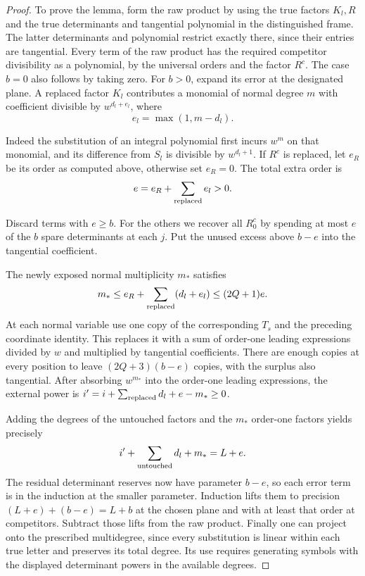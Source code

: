 \begin{proof}
To prove the lemma, form the raw product by using the true
factors \(K_l,R\) and the true determinants and tangential
polynomial in the distinguished frame. The latter determinants
and polynomial restrict exactly there, since their entries are
tangential. Every term of the raw product has the required
competitor divisibility as a polynomial, by the universal
orders and the factor \(R^c\). The case \(b=0\) also follows
by taking zero. For \(b>0\), expand its error at the designated
plane. A replaced factor \(K_l\) contributes a monomial of
normal degree \(m\) with coefficient divisible by
\(w^{d_l+e_l}\), where
\[
 e_l=\max(1,m-d_l).
\]

Indeed the substitution of an integral polynomial first incurs
\(w^m\) on that monomial, and its difference from \(S_l\)
is divisible by \(w^{d_l+1}\). If \(R^c\) is replaced, let
\(e_R\) be its order as computed above, otherwise set \(e_R=0\).
The total extra order is
\[
 e=e_R+\sum_{\rm replaced}e_l>0.
\]

Discard terms with \(e\ge b\). For the others we recover all
\(R_0^c\) by spending at most \(e\) of the \(b\) spare
determinants at each \(j\). Put the unused excess above
\(b-e\) into the tangential coefficient.

The newly exposed normal multiplicity \(m_*\) satisfies
\[
 m_*\le e_R+\sum_{\rm replaced}(d_l+e_l)
       \le (2Q+1)e .
\]
At each normal variable use one copy of the corresponding
\(T_s\) and the preceding coordinate identity. This replaces it
with a sum of order-one leading expressions divided by \(w\)
and multiplied by tangential coefficients. There are enough
copies at every position to leave \((2Q+3)(b-e)\) copies, with
the surplus also tangential. After absorbing \(w^{m_*}\) into the order-one leading
expressions, the external power is
\(i'=i+\sum_{\rm replaced}d_l+e-m_*\ge0\).

Adding the degrees of the untouched factors and the
\(m_*\) order-one factors yields precisely
\[
 i'+\sum_{\rm untouched} d_l+m_*=L+e .
\]
The residual determinant reserves now have parameter \(b-e\),
so each error term is in the induction at the smaller parameter. Induction lifts them
to precision \((L+e)+(b-e)=L+b\) at the chosen plane and with
at least that order at competitors. Subtract those lifts from
the raw product. Finally one can project onto the prescribed
multidegree, since every substitution is linear within each
true letter and preserves its total degree.  Its use requires generating symbols
with the displayed determinant powers in the available degrees.

\end{proof}

